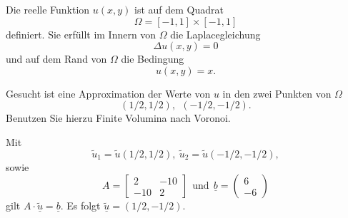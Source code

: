 Die reelle Funktion $u(x,y)$ ist auf dem Quadrat
\[
\Omega = [-1, 1] \times [-1,1]
\]
definiert. Sie erfüllt im Innern von $\Omega$ die Laplacegleichung
\[
\Delta u(x,y) = 0
\]
und auf dem Rand von $\Omega$ die Bedingung
\[
u(x,y) = x.
\]

Gesucht ist eine Approximation der Werte von $u$ in den zwei Punkten
von $\Omega$
\[
(1/2,1/2), \ \    (-1/2,-1/2).
\]
Benutzen Sie hierzu Finite Volumina nach Voronoi.  

\begin{loesung}
Mit 
\[
\tilde u_1 = \tilde u(1/2,1/2), \ \tilde u_2 = \tilde u(-1/2,-1/2),
\]
sowie 
\[
A = \left[\begin{array}{rr} 
2 & -10   \\
 -10 & 2 \end{array}\right] \ \ \text{und} \ \
\underline{b} =  \left(\begin{array}{r} 6 \\ -6 \end{array}\right)
\]
gilt $A \cdot \underline{\tilde u} = \underline{b}.$
Es folgt $\underline{\tilde u} = (1/2, -1/2).$
\end{loesung}

